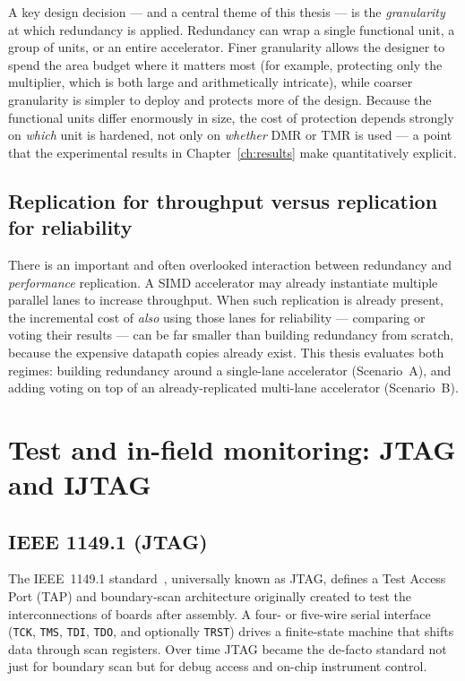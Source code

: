 A key design decision --- and a central theme of this thesis --- is the
\emph{granularity} at which redundancy is applied. Redundancy can wrap a single
functional unit, a group of units, or an entire accelerator. Finer granularity
allows the designer to spend the area budget where it matters most (for example,
protecting only the multiplier, which is both large and arithmetically
intricate), while coarser granularity is simpler to deploy and protects more of
the design. Because the functional units differ enormously in size, the cost of
protection depends strongly on \emph{which} unit is hardened, not only on
\emph{whether} DMR or TMR is used --- a point that the experimental results in
Chapter~\ref{ch:results} make quantitatively explicit.

\subsection{Replication for throughput versus replication for reliability}

There is an important and often overlooked interaction between redundancy and
\emph{performance} replication. A SIMD accelerator may already instantiate
multiple parallel lanes to increase throughput. When such replication is already
present, the incremental cost of \emph{also} using those lanes for reliability
--- comparing or voting their results --- can be far smaller than building
redundancy from scratch, because the expensive datapath copies already exist.
This thesis evaluates both regimes: building redundancy around a single-lane
accelerator (Scenario~A), and adding voting on top of an already-replicated
multi-lane accelerator (Scenario~B).

\section{Test and in-field monitoring: JTAG and IJTAG}
\label{sec:ijtag-bg}

\subsection{IEEE 1149.1 (JTAG)}

The IEEE~1149.1 standard~\cite{jtag}, universally known as JTAG, defines a Test Access Port
(TAP) and boundary-scan architecture originally created to test the
interconnections of boards after assembly. A four- or five-wire serial interface
(\texttt{TCK}, \texttt{TMS}, \texttt{TDI}, \texttt{TDO}, and optionally
\texttt{TRST}) drives a finite-state machine that shifts data through scan
registers. Over time JTAG became the de-facto standard not just for boundary
scan but for debug access and on-chip instrument control.

